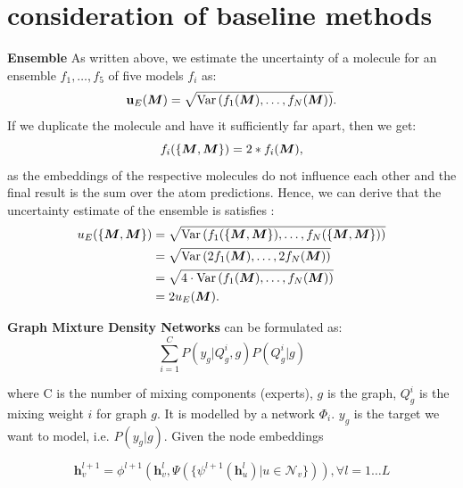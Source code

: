 \section{\desfour{} consideration of baseline methods} \label{app:locality_consideratins}
\textbf{Ensemble}
As written above, we estimate the uncertainty of a molecule for an ensemble ${f_1, \dots, f_5}$ of five models $f_i$ as:
\begin{equation}
    \mathbf{u}_E(\bm{M}) = \sqrt{\text{Var}\left(f_1(\bm{M}), \dots, f_N(\bm{M})\right)}.
\end{equation}
If we duplicate the molecule and have it sufficiently far apart, then we get: 
\begin{equation}
    f_i(\{\bm{M}, \bm{M}\}) = 2 * f_i(\bm{M}),
\end{equation}
as the embeddings of the respective molecules do not influence each other and the final result is the sum over the atom predictions. Hence, we can derive that the uncertainty estimate of the ensemble is satisfies \desfour{}:
\begin{equation}\begin{aligned}
    u_{E}(\{\bm{M}, \bm{M}\}) &= \sqrt{\operatorname{Var}\left(f_1(\{\bm{M}, \bm{M}\}), \dots, f_N(\{\bm{M}, \bm{M}\})\right)}\\ &= \sqrt{\operatorname{Var}\left(2f_1(\bm{M}), \dots, 2f_N(\bm{M})\right)}\\ &= \sqrt{4 \cdot \text{Var}\left(f_1(\bm{M}), \dots, f_N(\bm{M})\right)}\\ &= 2u_{E}(\bm{M}).
\end{aligned}\end{equation}


\textbf{Graph Mixture Density Networks} \cite{errica2021graph} can be formulated as: 
\begin{equation}
    \sum_{i=1}^CP(y_g| Q_g^i, g) P(Q_g^i|g)
\end{equation}

where C is the number of mixing components (experts), $g$ is the graph, $Q_g^i$ is the mixing weight $i$ for graph $g$. It is modelled by a network $\Phi_i$. $y_g$ is the target we want to model, i.e. $P(y_g | g)$.  Given the node embeddings

\begin{equation}
    \mathbf h_v^{l+1} = \phi^{l+1}\left(\mathbf h_v^l, \Psi(\{\psi^{l+1}(\mathbf h_u^l) | u \in \mathcal N_v\})\right), \forall l = 1 \dots L
\end{equation}

